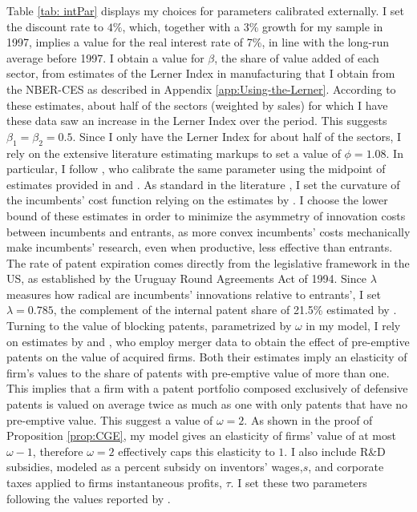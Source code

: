 Table \ref{tab: intPar} displays my choices for parameters calibrated
externally. I set the discount rate to $4\%$, which, together with
a 3\% growth for my sample in 1997, implies a value for the real interest
rate of 7\%, in line with the long-run average before 1997. I obtain
a value for $\beta$, the share of value added of each sector, from
estimates of the Lerner Index in manufacturing that I obtain from
the NBER-CES as described in Appendix \ref{app:Using-the-Lerner}.
According to these estimates, about half of the sectors (weighted
by sales) for which I have these data saw an increase in the Lerner
Index over the period. This suggests $\beta_{1}=\beta_{2}=0.5.$ Since
I only have the Lerner Index for about half of the sectors, I rely
on the extensive literature estimating markups to set a value of $\phi=1.08$.
In particular, I follow \citet{akcigitWhatHappenedBusiness2019a},
who calibrate the same parameter using the midpoint of estimates provided
in \citet{deloeckerRiseMarketPower2020} and \citet{eggertssonKaldorPikettyFacts2018}.
As standard in the literature \citep[see e.g., ][]{acemogluIntellectualPropertyRights2012},
I set the curvature of the incumbents' cost function relying on the
estimates by \citealp{kortumEquilibriumPatentRatio1993}. I choose
the lower bound of these estimates in order to minimize the asymmetry
of innovation costs between incumbents and entrants, as more convex
incumbents' costs mechanically make incumbents' research, even when
productive, less effective than entrants. The rate of patent expiration
comes directly from the legislative framework in the US, as established
by the Uruguay Round Agreements Act of 1994. Since $\lambda$ measures
how radical are incumbents' innovations relative to entrants', I set
$\lambda=0.785$, the complement of the internal patent share of 21.5\%
estimated by \citet{akcigitGrowthHeterogeneousInnovations2018}. Turning
to the value of blocking patents, parametrized by $\omega$ in my
model, I rely on estimates by \citet{czarnitzkiHowValuableAre2020}
and \citet{grimpePreemptingTechnologyCompetition2008}, who employ
merger data to obtain the effect of pre-emptive patents on the value
of acquired firms. Both their estimates imply an elasticity of firm's
values to the share of patents with pre-emptive value of more than
one. This implies that a firm with a patent portfolio composed exclusively
of defensive patents is valued on average twice as much as one with
only patents that have no pre-emptive value. This suggest a value
of $\omega=2$. As shown in the proof of Proposition \ref{prop:CGE},
my model gives an elasticity of firms' value of at most $\omega-1$,
therefore $\omega=2$ effectively caps this elasticity to $1$. I
also include R\&D subsidies, modeled as a percent subsidy on inventors'
wages,$s$, and corporate taxes applied to firms instantaneous profits,
$\tau$. I set these two parameters following the values reported
by \citet{akcigitOptimalTaxationPolicies2016}.

